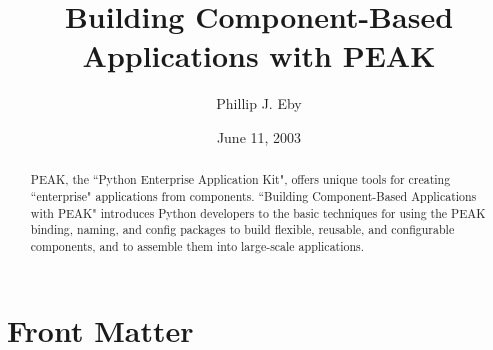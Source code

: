 \documentclass{manual}
\title{Building Component-Based \\ Applications with PEAK}
\author{Phillip J. Eby}
\date{June 11, 2003}       %
\begin{document}
\maketitle

\ifhtml
\chapter*{Front Matter\label{front}}
\fi

%

\begin{abstract}

\noindent

PEAK, the ``Python Enterprise Application Kit", offers unique tools for
creating ``enterprise" applications from components.  ``Building
Component-Based Applications with PEAK" introduces Python developers to
the basic techniques for using the PEAK binding, naming, and config
packages to build flexible, reusable, and configurable components, and
to assemble them into large-scale applications.

\end{abstract}

\tableofcontents





%

%












%
%
%
\renewcommand{\indexname}{Module Index}

\renewcommand{\indexname}{Index}
\end{document}
